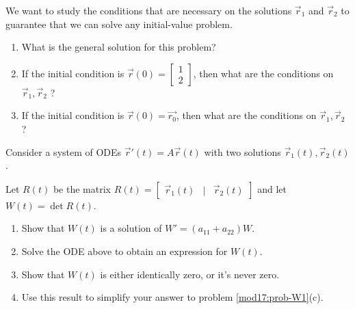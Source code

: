 \begin{exercises}
\begin{problist}
		We want to study the conditions that are necessary on the solutions $\vec{r}_1$ and $\vec{r}_2$ to guarantee that we can solve any initial-value problem.
		
		\begin{enumerate}
			\item What is the general solution for this problem?
			\item If the initial condition is $\vec{r}(0)= \begin{bmatrix} 1 \\ 2 \end{bmatrix}$, then what are the conditions on $\vec{r}_1,\vec{r}_2$ ?
			\item If the initial condition is $\vec{r}(0)= \vec{r_0}$, then what are the conditions on $\vec{r}_1,\vec{r}_2$ ?
		\end{enumerate}

		\prob Consider a system of ODEs $\vec{r}'(t) = A \vec{r}(t)$ with two solutions $\vec{r}_1(t), \vec{r}_2(t)$.
		
			Let $R(t)$ be the matrix 
				$R(t) = \begin{bmatrix} \vec{r}_1(t) & | & \vec{r}_2(t)	\end{bmatrix} $ 
				and let $W(t) = \det R(t)$.
		
		\begin{enumerate}
			\item Show that $W(t)$ is a solution of $W' = (a_{11} + a_{22}) W$.
			\item Solve the ODE above to obtain an expression for $W(t)$.
			\item Show that $W(t)$ is either identically zero, or it's never zero. 
			\item Use this result to simplify your answer to problem \ref{mod17:prob-W1}(c).
		\end{enumerate}
	
	\end{problist}
\end{exercises}
